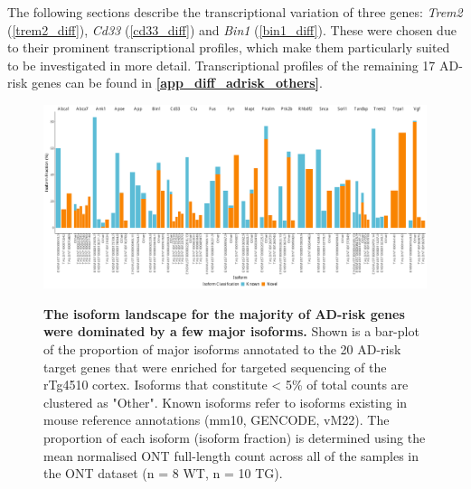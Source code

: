 The following sections describe the transcriptional variation of three genes: \textit{Trem2} (\cref{trem2_diff}), \textit{Cd33} (\cref{cd33_diff}) and \textit{Bin1} (\cref{bin1_diff}). These were chosen due to their prominent transcriptional profiles, which make them particularly suited to be investigated in more detail. Transcriptional profiles of the remaining 17 AD-risk genes can be found in \textbf{\cref{app_diff_adrisk_others}}.


\begin{landscape}
	\begin{figure}[htp]
		\centering
		\includegraphics[page=1,trim={0 0 0 0},scale =0.4]{Figures/GlobalIF.pdf}
		\captionsetup{width=1.5\textwidth}
		\label{fig:globalIF}
		\caption[Identification of major isoforms annotated to AD-risk target genes]%
		{\textbf{The isoform landscape for the majority of AD-risk genes were dominated by a few major isoforms.} Shown is a bar-plot of the proportion of major isoforms annotated to the 20 AD-risk target genes that were enriched for targeted sequencing of the rTg4510 cortex. Isoforms that constitute < 5\% of total counts are clustered as "Other". Known isoforms refer to isoforms existing in mouse reference annotations (mm10, GENCODE, vM22). The proportion of each isoform (isoform fraction) is determined using the mean normalised ONT full-length count across all of the samples in the ONT dataset (n = 8 WT, n = 10 TG). }   
	\end{figure}
\end{landscape}

